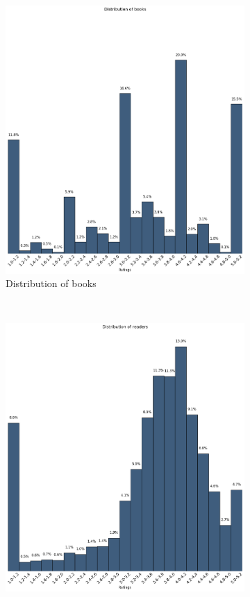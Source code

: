 \documentclass[11pt]{article}
\begin{document}
\begin{figure}
        \centering
        \begin{subfigure}[b]{0.6\textwidth}
                \includegraphics[width=\textwidth]{images/books_ratings}
                \caption{Distribution of books}
        \end{subfigure}%
        ~ %
        \begin{subfigure}[b]{0.6\textwidth}
                \includegraphics[width=\textwidth]{images/user_ratings}

\end{subfigure}
\end{figure}
\end{document}
